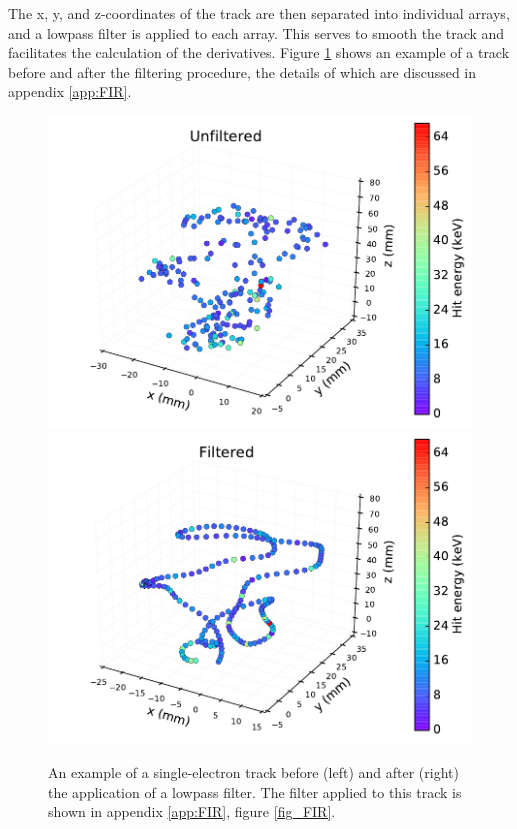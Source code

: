 \documentclass{JINST}
\begin{document}
The x, y, and z-coordinates of the track are then separated into individual arrays, and a lowpass 
filter is applied to each array.  This serves to smooth the track and facilitates the calculation of 
the derivatives.  Figure \ref{fig_flt} shows an example of a track before and after the filtering procedure, the
details of which are discussed in appendix \ref{app:FIR}.

\begin{figure}[!htb]
	\centering
	\includegraphics[scale=0.48]{fig/plt_trk_unflt_nmagse2_6.pdf}
	\includegraphics[scale=0.48]{fig/plt_trk_flt_nmagse2_6.pdf}
	\caption{\label{fig_flt}An example of a single-electron track before (left) and after (right) the application of a lowpass filter.  The filter applied to this track is shown in appendix \protect\ref{app:FIR}, figure \protect\ref{fig_FIR}.}
\end{figure}
\end{document}
